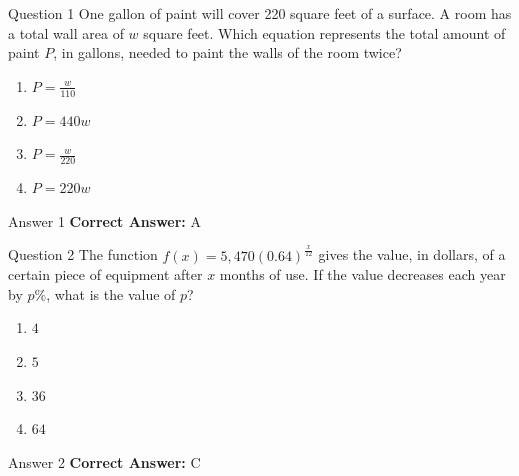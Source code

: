 \documentclass{beamer}
\begin{document}
\begin{frame}{Question 1}
\small
One gallon of paint will cover 220 square feet of a surface. A room has a total wall area of \( w \) square feet. Which equation represents the total amount of paint \( P \), in gallons, needed to paint the walls of the room twice?
\vspace{0.35cm}
\begin{enumerate}
    \item[A.] \(\displaystyle P = \frac{w}{110}\)
    \item[B.] \(\displaystyle P = 440w\)
    \item[C.] \(\displaystyle P = \frac{w}{220}\)
    \item[D.] \(\displaystyle P = 220w\)
\end{enumerate}

\end{frame}
\begin{frame}{Answer 1}
\small
\textbf{Correct Answer:} A
\end{frame}

\begin{frame}{Question 2}
\small
The function \(\displaystyle f(x) = 5,470(0.64)^{\frac{x}{12}}\) gives the value, in dollars, of a certain piece of equipment after \(\displaystyle x\) months of use. If the value decreases each year by \(\displaystyle p\%\), what is the value of \(\displaystyle p\)?
\vspace{0.35cm}
\begin{enumerate}
    \item[A.] \(\displaystyle 4\)
    \item[B.] \(\displaystyle 5\)
    \item[C.] \(\displaystyle 36\)
    \item[D.] \(\displaystyle 64\)
\end{enumerate}

\end{frame}
\begin{frame}{Answer 2}
\small
\textbf{Correct Answer:} C
\end{frame}
\end{document}
